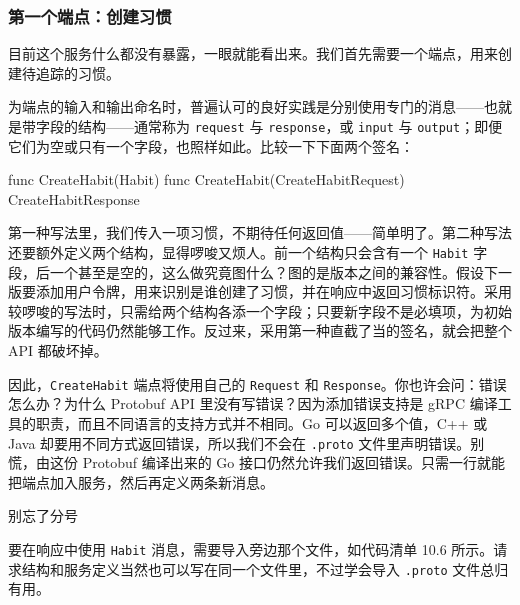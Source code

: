 \subsubsection{第一个端点：创建习惯}

目前这个服务什么都没有暴露，一眼就能看出来。我们首先需要一个端点，用来创建待追踪的习惯。

为端点的输入和输出命名时，普遍认可的良好实践是分别使用专门的消息——也就是带字段的结构——通常称为 \texttt{request} 与 \texttt{response}，或 \texttt{input} 与 \texttt{output}；即便它们为空或只有一个字段，也照样如此。比较一下下面两个签名：

\begin{gocode}[]
func CreateHabit(Habit)
func CreateHabit(CreateHabitRequest) CreateHabitResponse
\end{gocode}

第一种写法里，我们传入一项习惯，不期待任何返回值——简单明了。第二种写法还要额外定义两个结构，显得啰唆又烦人。前一个结构只会含有一个 \texttt{Habit} 字段，后一个甚至是空的，这么做究竟图什么？图的是版本之间的兼容性。假设下一版要添加用户令牌，用来识别是谁创建了习惯，并在响应中返回习惯标识符。采用较啰唆的写法时，只需给两个结构各添一个字段；只要新字段不是必填项，为初始版本编写的代码仍然能够工作。反过来，采用第一种直截了当的签名，就会把整个 API 都破坏掉。

因此，\texttt{CreateHabit} 端点将使用自己的 \texttt{Request} 和 \texttt{Response}。你也许会问：错误怎么办？为什么 Protobuf API 里没有写错误？因为添加错误支持是 gRPC 编译工具的职责，而且不同语言的支持方式并不相同。Go 可以返回多个值，C++ 或 Java 却要用不同方式返回错误，所以我们不会在 \texttt{.proto} 文件里声明错误。别慌，由这份 Protobuf 编译出来的 Go 接口仍然允许我们返回错误。只需一行就能把端点加入服务，然后再定义两条新消息。


\begin{codeannotations}
\item 别忘了分号
\end{codeannotations}

要在响应中使用 \texttt{Habit} 消息，需要导入旁边那个文件，如代码清单 10.6 所示。请求结构和服务定义当然也可以写在同一个文件里，不过学会导入 \texttt{.proto} 文件总归有用。

